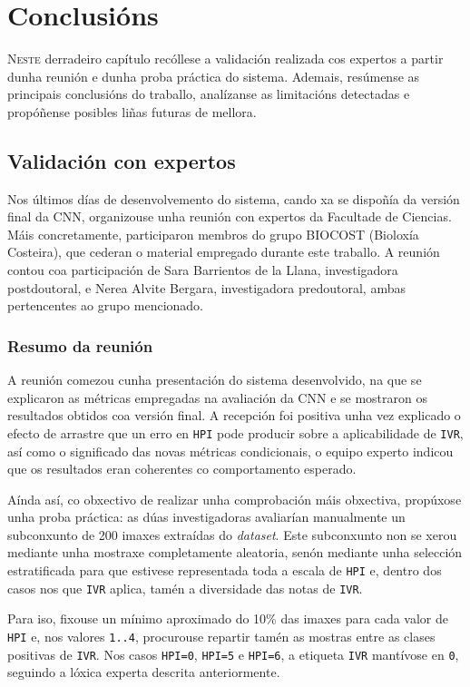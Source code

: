\chapter{Conclusións}
\label{chap:conclusions}

\lettrine{N}{este} derradeiro capítulo recóllese a validación realizada cos expertos a partir
dunha reunión e dunha proba práctica do sistema. Ademais, resúmense as principais conclusións
do traballo, analízanse as limitacións detectadas e propóñense posibles liñas futuras de mellora.

\section{Validación con expertos}
\label{validacion-con-expertos}
Nos últimos días de desenvolvemento do sistema, cando xa se dispoñía da versión final da CNN,
organizouse unha reunión con expertos da Facultade de Ciencias. Máis concretamente, participaron
membros do grupo BIOCOST (Bioloxía Costeira), que cederan o material empregado durante este
traballo. A reunión contou coa participación de Sara Barrientos de la Llana, investigadora
postdoutoral, e Nerea Alvite Bergara, investigadora predoutoral, ambas pertencentes ao grupo
mencionado.

\subsection{Resumo da reunión}
A reunión comezou cunha presentación do sistema desenvolvido, na que se explicaron as métricas
empregadas na avaliación da CNN e se mostraron os resultados obtidos coa versión final. A recepción
foi positiva unha vez explicado o efecto de arrastre que un erro en \texttt{HPI} pode producir sobre
a aplicabilidade de \texttt{IVR}, así como o significado das novas métricas condicionais, o equipo
experto indicou que os resultados eran coherentes co comportamento esperado.

Aínda así, co obxectivo de realizar unha comprobación máis obxectiva, propúxose unha proba práctica:
as dúas investigadoras avaliarían manualmente un subconxunto de 200 imaxes extraídas do
\textit{dataset}. Este subconxunto non se xerou mediante unha mostraxe completamente aleatoria, senón
mediante unha selección estratificada para que estivese representada toda a escala de \texttt{HPI} e,
dentro dos casos nos que \texttt{IVR} aplica, tamén a diversidade das notas de \texttt{IVR}.

Para iso, fixouse un mínimo aproximado do 10\% das imaxes para cada valor de \texttt{HPI} e, nos
valores \texttt{1..4}, procurouse repartir tamén as mostras entre as clases positivas de
\texttt{IVR}. Nos casos \texttt{HPI=0}, \texttt{HPI=5} e \texttt{HPI=6}, a etiqueta \texttt{IVR}
mantívose en \texttt{0}, seguindo a lóxica experta descrita anteriormente.


